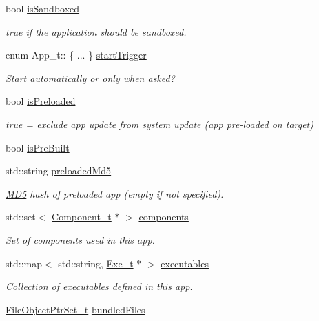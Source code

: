 \begin{DoxyCompactItemize}
bool \hyperlink{struct_app__t_a63b6c9be6a010cfcbaea6ded9de03240}{is\+Sandboxed}
\begin{DoxyCompactList}\small\item\em true if the application should be sandboxed. \end{DoxyCompactList}\item 
enum App\+\_\+t\+:: \{ ... \}  \hyperlink{struct_app__t_ad654e0b454b6387c9fa7398e20b35135}{start\+Trigger}
\begin{DoxyCompactList}\small\item\em Start automatically or only when asked? \end{DoxyCompactList}\item 
bool \hyperlink{struct_app__t_a9bcfffd1c006082814e8a953c5140078}{is\+Preloaded}
\begin{DoxyCompactList}\small\item\em true = exclude app update from system update (app pre-\/loaded on target) \end{DoxyCompactList}\item 
bool \hyperlink{struct_app__t_aa70df224d5a7c415546d26f79a083185}{is\+Pre\+Built}
\item 
std\+::string \hyperlink{struct_app__t_a511b6d392993618d951bd2224516b1fc}{preloaded\+Md5}
\begin{DoxyCompactList}\small\item\em \hyperlink{class_m_d5}{M\+D5} hash of preloaded app (empty if not specified). \end{DoxyCompactList}\item 
std\+::set$<$ \hyperlink{struct_component__t}{Component\+\_\+t} $\ast$ $>$ \hyperlink{struct_app__t_a1012eb56314c12edc21188341976bed1}{components}
\begin{DoxyCompactList}\small\item\em Set of components used in this app. \end{DoxyCompactList}\item 
std\+::map$<$ std\+::string, \hyperlink{struct_exe__t}{Exe\+\_\+t} $\ast$ $>$ \hyperlink{struct_app__t_adec27f21af64fb0b0fcecc083006d62d}{executables}
\begin{DoxyCompactList}\small\item\em Collection of executables defined in this app. \end{DoxyCompactList}\item 
\hyperlink{file_system_object_8h_a47249ccd5f5ed84092b6523e81f5a398}{File\+Object\+Ptr\+Set\+\_\+t} \hyperlink{struct_app__t_ab56c092508e0e6f343abc4e297b7770b}{bundled\+Files}

\end{DoxyCompactItemize}
